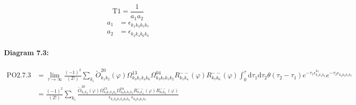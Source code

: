 \documentclass[10pt,a4paper]{article}
\begin{document}
\begin{equation}
\text{T}1 = \frac{1}{a_1a_2}\end{equation}
\begin{align*}
a_1 &= \epsilon^{}_{k_{1}k_{3}k_{5}k_{7}}\\
a_2 &= \epsilon^{}_{k_{2}k_{4}k_{6}k_{8}}
\end{align*}
\paragraph{Diagram 7.3:}
\begin{align}
\text{PO}2.7.3
&= \lim\limits_{\tau \to \infty}\frac{(-1)^2 }{(2!)}\sum_{k_i}\tilde{O}^{20}_{k_{1}k_{2}} (\varphi) \Omega^{13}_{k_{3}k_{1}k_{4}k_{6}} \Omega^{04}_{k_{3}k_{7}k_{5}k_{2}} R^{--}_{k_{5}k_{4}}(\varphi) R^{--}_{k_{7}k_{6}}(\varphi)\int_{0}^{\tau}\mathrm{d}\tau_1\mathrm{d}\tau_2\theta(\tau_2-\tau_1) e^{-\tau_1 \epsilon^{k_{3}}_{k_{1}k_{4}k_{6}}}e^{-\tau_2 \epsilon^{}_{k_{2}k_{3}k_{5}k_{7}}}
 \nonumber \\
&= \frac{(-1)^2 }{(2!)}\sum_{k_i}\frac{\tilde{O}^{20}_{k_{1}k_{2}} (\varphi) \Omega^{13}_{k_{3}k_{1}k_{4}k_{6}} \Omega^{04}_{k_{3}k_{7}k_{5}k_{2}} R^{--}_{k_{5}k_{4}}(\varphi) R^{--}_{k_{7}k_{6}}(\varphi)}{\epsilon^{}_{k_{1}k_{2}k_{5}k_{4}k_{7}k_{6}}\ \epsilon^{}_{k_{2}k_{3}k_{5}k_{7}}\ } 
\end{align}
\end{document}
